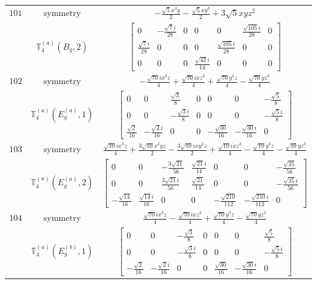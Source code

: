 \documentclass[fleqn,8pt,landscape]{jsarticle}
\begin{document}
\begin{longtable}{ccc}
$ 101 $ & $ \text{symmetry} $ & $ - \frac{\sqrt{5} x^{3} y}{2} - \frac{\sqrt{5} x y^{3}}{2} + 3 \sqrt{5} x y z^{2} $ \\
$  $ & $ \mathbb{T}_{4}^{(a)}(B_{g},2) $ & $ \begin{bmatrix} 0 & - \frac{\sqrt{7} i}{28} & 0 & 0 & 0 & \frac{\sqrt{105} i}{28} & 0 \\ \frac{\sqrt{7} i}{28} & 0 & 0 & 0 & \frac{\sqrt{105} i}{28} & 0 & 0 \\ 0 & 0 & 0 & \frac{\sqrt{42} i}{14} & 0 & 0 & 0 \end{bmatrix} $ \\ \hline
$ 102 $ & $ \text{symmetry} $ & $ - \frac{\sqrt{70} i x^{3} z}{4} + \frac{\sqrt{70} i x z^{3}}{4} + \frac{\sqrt{70} y^{3} z}{4} - \frac{\sqrt{70} y z^{3}}{4} $ \\
$  $ & $ \mathbb{T}_{4}^{(a)}(E_{g}^{(a)},1) $ & $ \begin{bmatrix} 0 & 0 & \frac{\sqrt{3}}{8} & 0 & 0 & 0 & - \frac{\sqrt{5}}{8} \\ 0 & 0 & - \frac{\sqrt{3} i}{8} & 0 & 0 & 0 & - \frac{\sqrt{5} i}{8} \\ \frac{\sqrt{2}}{16} & - \frac{\sqrt{2} i}{16} & 0 & 0 & - \frac{\sqrt{30}}{16} & - \frac{\sqrt{30} i}{16} & 0 \end{bmatrix} $ \\ \hline
$ 103 $ & $ \text{symmetry} $ & $ \frac{\sqrt{10} i x^{3} z}{4} + \frac{3 \sqrt{10} x^{2} y z}{2} - \frac{3 \sqrt{10} i x y^{2} z}{2} + \frac{\sqrt{10} i x z^{3}}{4} - \frac{\sqrt{10} y^{3} z}{4} - \frac{\sqrt{10} y z^{3}}{4} $ \\
$  $ & $ \mathbb{T}_{4}^{(a)}(E_{g}^{(a)},2) $ & $ \begin{bmatrix} 0 & 0 & - \frac{3 \sqrt{21}}{56} & \frac{\sqrt{21} i}{14} & 0 & 0 & - \frac{\sqrt{35}}{56} \\ 0 & 0 & \frac{3 \sqrt{21} i}{56} & \frac{\sqrt{21}}{14} & 0 & 0 & - \frac{\sqrt{35} i}{56} \\ - \frac{\sqrt{14}}{16} & \frac{\sqrt{14} i}{16} & 0 & 0 & - \frac{\sqrt{210}}{112} & - \frac{\sqrt{210} i}{112} & 0 \end{bmatrix} $ \\ \hline
$ 104 $ & $ \text{symmetry} $ & $ \frac{\sqrt{70} i x^{3} z}{4} - \frac{\sqrt{70} i x z^{3}}{4} + \frac{\sqrt{70} y^{3} z}{4} - \frac{\sqrt{70} y z^{3}}{4} $ \\
$  $ & $ \mathbb{T}_{4}^{(a)}(E_{g}^{(b)},1) $ & $ \begin{bmatrix} 0 & 0 & - \frac{\sqrt{3}}{8} & 0 & 0 & 0 & \frac{\sqrt{5}}{8} \\ 0 & 0 & - \frac{\sqrt{3} i}{8} & 0 & 0 & 0 & - \frac{\sqrt{5} i}{8} \\ - \frac{\sqrt{2}}{16} & - \frac{\sqrt{2} i}{16} & 0 & 0 & \frac{\sqrt{30}}{16} & - \frac{\sqrt{30} i}{16} & 0 \end{bmatrix} $ \\ \hline

\end{longtable}
\end{document}
